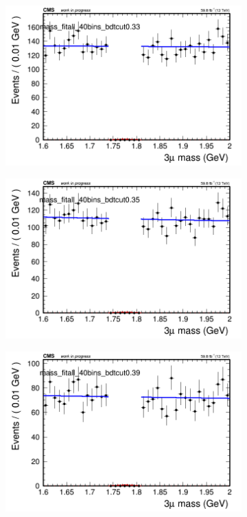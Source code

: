 \begin{figure}[H]
\begin{subfigure}{0.2\textwidth}
        \caption{}
    \end{subfigure}
    \begin{subfigure}{0.2\textwidth}
        \includegraphics[width=\textwidth]{power_law/plots/all/massfit_all_40bins_bdtcut0.33.png}
        \caption{}
    \end{subfigure}
    \begin{subfigure}{0.2\textwidth}
        \includegraphics[width=\textwidth]{power_law/plots/all/massfit_all_40bins_bdtcut0.35.png}
        \caption{}
    \end{subfigure}
    \begin{subfigure}{0.2\textwidth}
        \includegraphics[width=\textwidth]{power_law/plots/all/massfit_all_40bins_bdtcut0.39.png}

\end{subfigure}
\end{figure}
